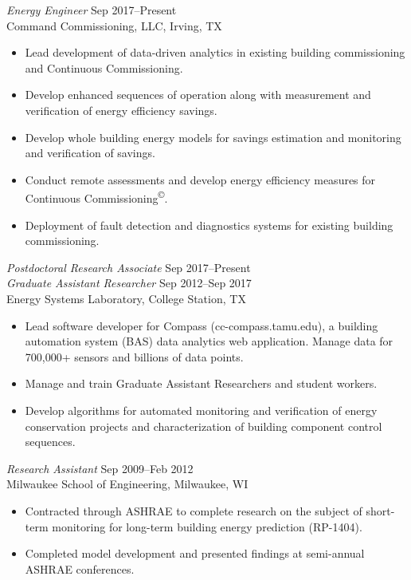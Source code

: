 \documentclass[margin]{res} %
\begin{document}
\begin{resume}
{\textit{Energy Engineer} \hfill Sep 2017--Present} \\
Command Commissioning, LLC, Irving, TX

\begin{itemize}\itemsep -2pt %
\item Lead development of data-driven analytics in existing building commissioning and Continuous Commissioning\textsuperscript{\textregistered{}}.
\item Develop enhanced sequences of operation along with measurement and verification of energy efficiency savings.
\item Develop whole building energy models for savings estimation and monitoring and verification of savings.
\item Conduct remote assessments and develop energy efficiency measures for Continuous Commissioning\textsuperscript{\copyright{}}.
\item Deployment of fault detection and diagnostics systems for existing building commissioning.
\end{itemize}

{\sl Postdoctoral Research Associate}  \hfill Sep 2017--Present \\
{\sl Graduate Assistant Researcher} \hfill Sep 2012--Sep 2017 \\
Energy Systems Laboratory, College Station, TX

\begin{itemize} \itemsep -2pt %
    \item Lead software developer for Compass (cc-compass.tamu.edu), a building automation system (BAS) data
          analytics web application. Manage data for 700,000+ sensors and billions of data points.
    \item Manage and train Graduate Assistant Researchers and student workers.
    \item Develop algorithms for automated monitoring and verification of energy conservation projects and characterization of building component control sequences.
\end{itemize}

\vspace{10pt}

{\sl Research Assistant} \hfill Sep 2009--Feb 2012  \\
Milwaukee School of Engineering, Milwaukee, WI
\begin{itemize}\itemsep -2pt
\item Contracted through ASHRAE to complete research on the subject of short-term monitoring for long-term building energy prediction (RP-1404).
\item Completed model development and presented findings at semi-annual ASHRAE conferences.
\end{itemize}



\end{resume}
\end{document}
